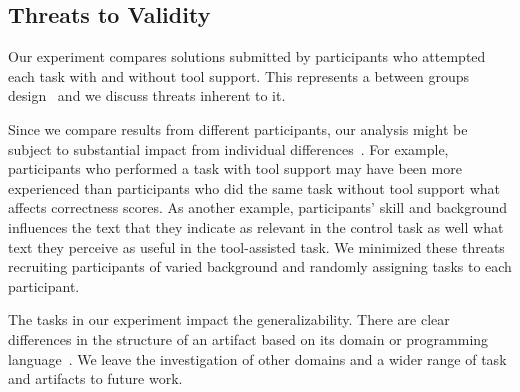 
\clearpage

\subsection{Threats to Validity}
\label{cp6:threats}







Our experiment compares solutions submitted by participants who attempted each task with and without tool support. 
This represents a between groups design~\cite{Lazar2017-cp3} and we discuss threats inherent to it. 



Since we compare results from different participants, our analysis might be subject to substantial 
impact from individual differences~\cite{Lazar2017-cp3}. 
For example, participants who performed a task with tool support may have been more experienced than participants 
who did the same task without tool support what affects correctness scores.
As another example,  participants' skill and background 
influences the text that they indicate as relevant in the control task as well 
what text they perceive as useful in the tool-assisted task. 
We minimized these threats recruiting participants of varied background and randomly
assigning tasks to each participant.



The tasks in our experiment impact the generalizability. 
There are clear differences in the structure of an artifact 
based on its domain or programming language~\cite{baltes2020}.
We leave the investigation of other domains and a wider range of task 
and artifacts to future work. 



